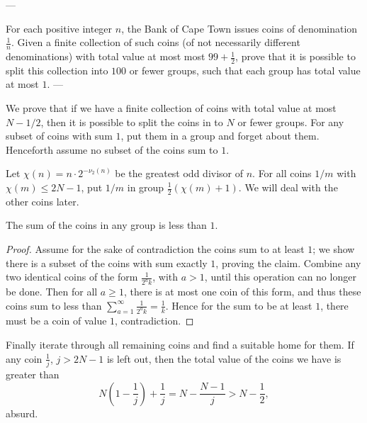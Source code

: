 
---

For each positive integer $n$, the Bank of Cape Town issues coins of denomination $\frac1n$. Given a finite collection of such coins (of not necessarily different denominations) with total value at most most $99+\frac12$, prove that it is possible to split this collection into $100$ or fewer groups, such that each group has total value at most $1$.
---

We prove that if we have a finite collection of coins with total value at most $N-1/2$, then it is possible to split the coins in to $N$ or fewer groups. For any subset of coins with sum $1$, put them in a group and forget about them. Henceforth assume no subset of the coins sum to $1$.

Let $\chi(n)=n\cdot 2^{-\nu_2(n)}$ be the greatest odd divisor of $n$. For all coins $1/m$ with $\chi(m)\le 2N-1$, put $1/m$ in group $\tfrac12(\chi(m)+1)$. We will deal with the other coins later.
\begin{iclaim*}
    The sum of the coins in any group is less than $1$.
\end{iclaim*}
\begin{proof}
    Assume for the sake of contradiction the coins sum to at least $1$; we show there is a subset of the coins with sum exactly $1$, proving the claim. Combine any two identical coins of the form $\tfrac1{2^ak}$, with $a>1$, until this operation can no longer be done. Then for all $a\ge 1$, there is at most one coin of this form, and thus these coins sum to less than $\sum_{a=1}^\infty\frac1{2^ak}=\frac1k$. Hence for the sum to be at least $1$, there must be a coin of value $1$, contradiction.
\end{proof}

Finally iterate through all remaining coins and find a suitable home for them. If any coin $\tfrac1j$, $j>2N-1$ is left out, then the total value of the coins we have is greater than \[N\left(1-\frac1j\right)+\frac1j=N-\frac{N-1}j>N-\frac12,\]
absurd.
